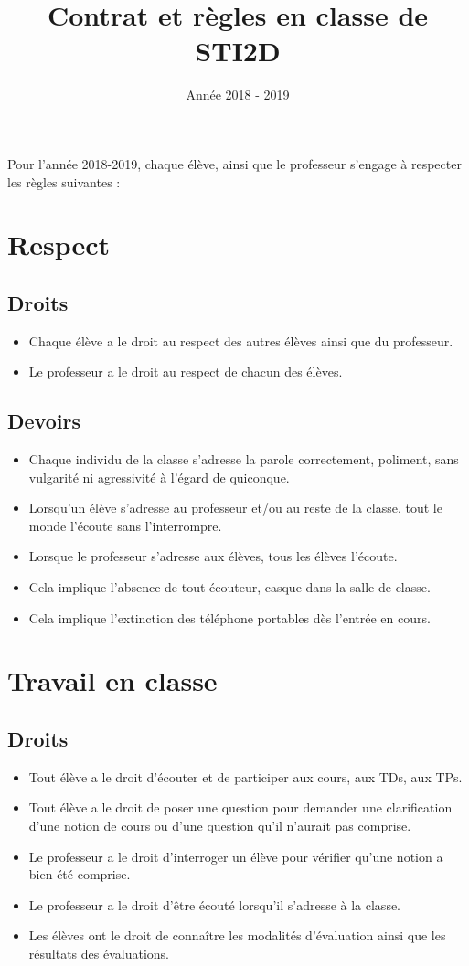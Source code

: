 \documentclass[11pt]{article}
\begin{document}
\UPSTIbuildPage
\title{Contrat et règles en classe de STI2D}
\date{Année 2018 - 2019}

Pour l'année 2018-2019, chaque élève, ainsi que le professeur s'engage à respecter les règles suivantes :
\section{Respect}
\subsection{Droits}
\begin{itemize}
    \item Chaque élève a le droit au respect des autres élèves ainsi que du professeur.
    \item Le professeur a le droit au respect de chacun des élèves.
\end{itemize}

\subsection{Devoirs}
\begin{itemize}
    \item Chaque individu de la classe s'adresse la parole correctement, poliment, sans vulgarité ni agressivité à l'égard de quiconque.
    \item Lorsqu'un élève s'adresse au professeur et/ou au reste de la classe, tout le monde l'écoute sans l'interrompre.
    \item Lorsque le professeur s'adresse aux élèves, tous les élèves l'écoute.
      \item Cela implique l'absence de tout écouteur, casque dans la salle de classe.
      \item Cela implique l'extinction des téléphone portables dès l'entrée en cours.
\end{itemize}

\section{Travail en classe}
\subsection{Droits}
\begin{itemize}
    \item Tout élève a le droit d'écouter et de participer aux cours, aux TDs, aux TPs.
    \item Tout élève a le droit de poser une question pour demander une clarification d'une notion de cours ou d'une question qu'il n'aurait pas comprise.
    \item Le professeur a le droit d'interroger un élève pour vérifier qu'une notion a bien été comprise.
    \item Le professeur a le droit d'être écouté lorsqu'il s'adresse à la classe.
    \item Les élèves ont le droit de connaître les modalités d'évaluation ainsi que les résultats des évaluations.
\end{itemize}
\end{document}
